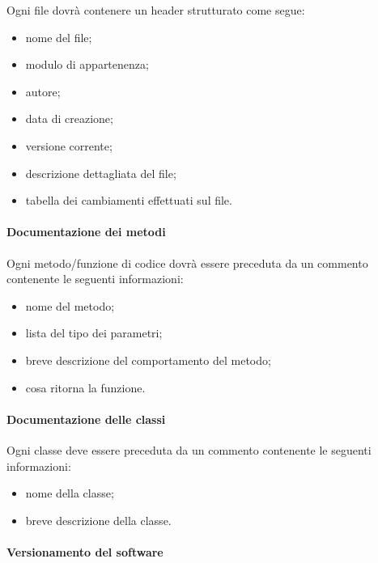 Ogni file dovrà contenere un header strutturato come segue:
\begin{itemize}
\item {} nome del file;
\item {} modulo di appartenenza;
\item {} autore;
\item {} data di creazione;
\item {} versione corrente;
\item {} descrizione dettagliata del file;
\item {} tabella dei cambiamenti effettuati sul file.
\end{itemize}

\paragraph{Documentazione dei metodi}

Ogni metodo/funzione di codice dovrà essere preceduta da un commento contenente le seguenti informazioni:
\begin{itemize}
\item {} nome del metodo;
\item {} lista del tipo dei parametri;
\item {} breve descrizione del comportamento del metodo;
\item {} cosa ritorna la funzione.
\end{itemize}

\paragraph{Documentazione delle classi}

Ogni classe deve essere preceduta da un commento contenente le seguenti informazioni:
\begin{itemize}
\item {} nome della classe;
\item {} breve descrizione della classe.
\end{itemize}

\paragraph{Versionamento del software}

